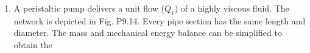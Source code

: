 \documentclass[../main.tex]{subfiles}
\begin{document}
\begin{multicols}{2}
\begin{enumerate}
	$$ F_{1}y_{i-1}+F_{2}x_{i+1}=F_{1}y_{i}+F_{2}x_{i} $$
	\begin{flushright}
	(P9.13a)
	\end{flushright}
	At each stage, an equilibrium is assumed to be established between $y_{i}$ and $x_{i}$ as in
	$$ K=\frac{x_{i}}{y_{i}} $$
	\begin{flushright}
	(P9.13b)
	\end{flushright}
	where $K$ is called a distribution coefficient. Equation (P9.13b) can be solved for $x_{i}$ and substituted into Eq. (P9.13a) to yield
	$$y_{i-1}-(1+\frac{F_{2}}{F_{1}}K)y_{i}+(\frac{F_{2}}{F_{1}}K)y_{i+1}=0$$
	\begin{flushright}
	(P9.13c)
	\end{flushright}
	If $F_{1}=400 kg/h$, $y_{in}=0.1$, $F_{2}=800 kg/h$, $x_{in}=0$, and $K=5$, determine the values of $y_{out}$ and $x_{out}$ if a five-stage reactor is used. Note that Eq. (P9.13c) must be modified to account for the inflow weight fractions when applied to the first and last stages.
	\item A peristaltic pump delivers a unit flow ($Q_{1}$) of a highly viscous fluid. The network is depicted in Fig. P9.14. Every pipe section has the same length and diameter. The mass and mechanical energy balance can be simplified to obtain the
\end{enumerate}
\end{multicols}
\end{document}
